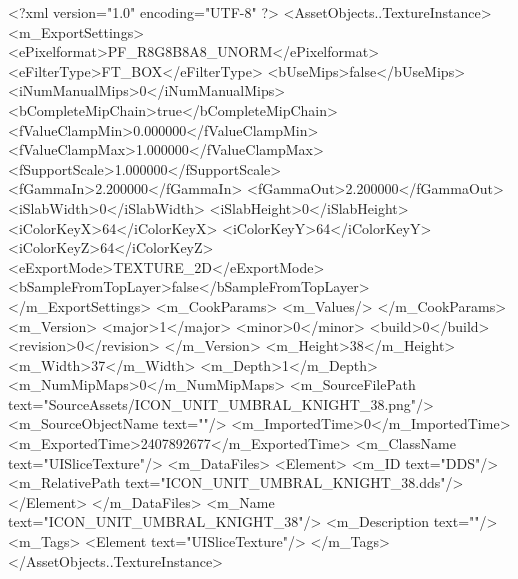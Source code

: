 <?xml version="1.0" encoding="UTF-8" ?>
<AssetObjects..TextureInstance>
	<m_ExportSettings>
		<ePixelformat>PF_R8G8B8A8_UNORM</ePixelformat>
		<eFilterType>FT_BOX</eFilterType>
		<bUseMips>false</bUseMips>
		<iNumManualMips>0</iNumManualMips>
		<bCompleteMipChain>true</bCompleteMipChain>
		<fValueClampMin>0.000000</fValueClampMin>
		<fValueClampMax>1.000000</fValueClampMax>
		<fSupportScale>1.000000</fSupportScale>
		<fGammaIn>2.200000</fGammaIn>
		<fGammaOut>2.200000</fGammaOut>
		<iSlabWidth>0</iSlabWidth>
		<iSlabHeight>0</iSlabHeight>
		<iColorKeyX>64</iColorKeyX>
		<iColorKeyY>64</iColorKeyY>
		<iColorKeyZ>64</iColorKeyZ>
		<eExportMode>TEXTURE_2D</eExportMode>
		<bSampleFromTopLayer>false</bSampleFromTopLayer>
	</m_ExportSettings>
	<m_CookParams>
		<m_Values/>
	</m_CookParams>
	<m_Version>
		<major>1</major>
		<minor>0</minor>
		<build>0</build>
		<revision>0</revision>
	</m_Version>
	<m_Height>38</m_Height>
	<m_Width>37</m_Width>
	<m_Depth>1</m_Depth>
	<m_NumMipMaps>0</m_NumMipMaps>
	<m_SourceFilePath text="SourceAssets/ICON_UNIT_UMBRAL_KNIGHT_38.png"/>
	<m_SourceObjectName text=""/>
	<m_ImportedTime>0</m_ImportedTime>
	<m_ExportedTime>2407892677</m_ExportedTime>
	<m_ClassName text="UISliceTexture"/>
	<m_DataFiles>
		<Element>
			<m_ID text="DDS"/>
			<m_RelativePath text="ICON_UNIT_UMBRAL_KNIGHT_38.dds"/>
		</Element>
	</m_DataFiles>
	<m_Name text="ICON_UNIT_UMBRAL_KNIGHT_38"/>
	<m_Description text=""/>
	<m_Tags>
		<Element text="UISliceTexture"/>
	</m_Tags>
</AssetObjects..TextureInstance>

